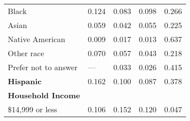 {\begin{tabular}{L{5.5cm} C{3.5cm} C{3.5cm} C{3.5cm} C{4cm}}
                          Black                           &                          0.124                           &                          0.083                           &                          0.098                           &                          0.266                            \\
                          Asian                           &                          0.059                           &                          0.042                           &                          0.055                           &                          0.225                            \\
                     Native American                      &                          0.009                           &                          0.017                           &                          0.013                           &                          0.637                            \\
                        Other race                        &                          0.070                           &                          0.057                           &                          0.043                           &                          0.218                            \\
                   Prefer not to answer                   &                           ---                            &                          0.033                           &                          0.026                           &                          0.415                            \\
\textbf{Hispanic}                                         &                          0.162                           &                          0.100                           &                          0.087                           &                          0.378                            \\
\textbf{Household Income}                                 &                                                          &                                                          &                                                          &                                                           \\
                     \$14,999 or less                     &                          0.106                           &                          0.152                           &                          0.120                           &                          0.047                            \\

\end{tabular}}
